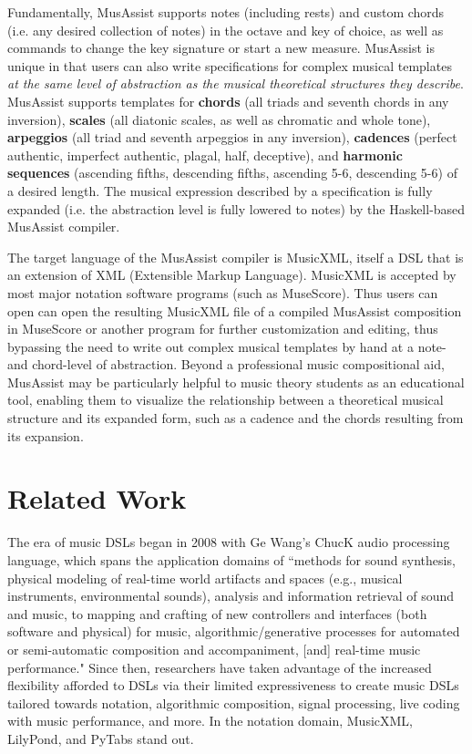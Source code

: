 \documentclass{article}
\begin{document}
Fundamentally, MusAssist supports notes (including rests) and custom chords (i.e. any desired collection of notes)
in the octave and key of choice, as well as commands to change the key signature or start a new measure.
 MusAssist is unique in that users can also write specifications for complex musical templates \textit{at the same level of abstraction
as the musical theoretical structures they describe}. MusAssist supports templates for
\textbf{chords} (all triads and seventh chords in any inversion),
\textbf{scales} (all diatonic scales, as well as chromatic and whole tone),
\textbf{arpeggios} (all triad and seventh arpeggios in any inversion),
\textbf{cadences} (perfect authentic, imperfect authentic, plagal, half, deceptive), and 
\textbf{harmonic sequences} (ascending
fifths, descending fifths, ascending 5-6, descending 5-6) of a desired length. The musical expression 
described by a specification is fully expanded (i.e. the abstraction level is
fully lowered to notes) by the Haskell-based MusAssist compiler.

The target language of the MusAssist compiler is MusicXML, itself a DSL that is an extension of
XML (Extensible Markup Language). MusicXML is accepted by most major notation software programs (such as MuseScore). 
Thus users can open can open the resulting MusicXML file of a compiled MusAssist composition in MuseScore or another
program for further customization and editing, thus bypassing the need to write out complex musical templates by hand at a 
note- and chord-level of abstraction. Beyond a professional music compositional aid, MusAssist may be particularly 
helpful to music theory students as an educational tool, enabling them to visualize the relationship between a theoretical musical structure 
and its expanded form, such as a cadence and the chords resulting from its expansion.


\section{Related Work}\label{sec:related_work}

The era of music DSLs began in 2008 with Ge Wang's ChucK audio processing language, which  
spans the application domains of ``methods for sound synthesis, physical modeling of real-time world artifacts and spaces (e.g., 
musical instruments, environmental sounds), analysis and information retrieval of sound and music, to 
mapping and crafting of new controllers and interfaces (both software and physical) for music, 
algorithmic/generative processes for automated or semi-automatic composition and accompaniment, [and] 
real-time music performance." %
Since then, researchers have taken advantage of the increased flexibility afforded to DSLs via their limited expressiveness to create
music DSLs tailored towards notation, algorithmic composition, signal processing, live coding with music performance, and more. In the 
 notation domain, MusicXML, LilyPond, and PyTabs stand out.
\end{document}
